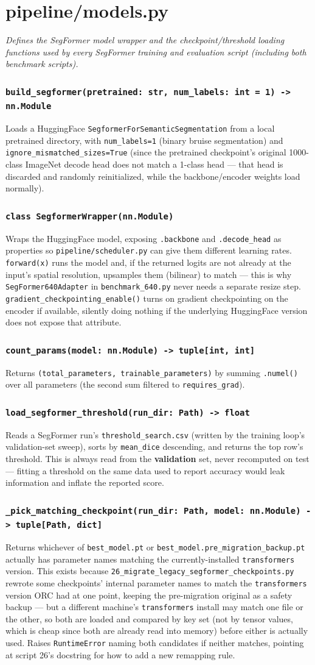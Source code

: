 \documentclass[11pt]{article}
\newcommand{\role}[1]{\par\noindent\textit{#1}\par\vspace{0.5em}}
\newcommand{\func}[1]{\subsubsection*{\texttt{#1}}}
\begin{document}
\newpage
\section{pipeline/models.py}
\role{Defines the SegFormer model wrapper and the checkpoint/threshold loading
functions used by every SegFormer training and evaluation script (including
both benchmark scripts).}

\func{build\_segformer(pretrained: str, num\_labels: int = 1) -> nn.Module}
Loads a HuggingFace \texttt{SegformerForSemanticSegmentation} from a local
pretrained directory, with \texttt{num\_labels=1} (binary bruise segmentation)
and \texttt{ignore\_mismatched\_sizes=True} (since the pretrained checkpoint's
original 1000-class ImageNet decode head does not match a 1-class head --- that
head is discarded and randomly reinitialized, while the backbone/encoder weights
load normally).

\func{class SegformerWrapper(nn.Module)}
Wraps the HuggingFace model, exposing \texttt{.backbone} and
\texttt{.decode\_head} as properties so \texttt{pipeline/scheduler.py} can give
them different learning rates. \texttt{forward(x)} runs the model and, if the
returned logits are not already at the input's spatial resolution, upsamples
them (bilinear) to match --- this is why \texttt{SegFormer640Adapter} in
\texttt{benchmark\_640.py} never needs a separate resize step.
\texttt{gradient\_checkpointing\_enable()} turns on gradient checkpointing on the
encoder if available, silently doing nothing if the underlying HuggingFace
version does not expose that attribute.

\func{count\_params(model: nn.Module) -> tuple[int, int]}
Returns \texttt{(total\_parameters, trainable\_parameters)} by summing
\texttt{.numel()} over all parameters (the second sum filtered to
\texttt{requires\_grad}).

\func{load\_segformer\_threshold(run\_dir: Path) -> float}
Reads a SegFormer run's \texttt{threshold\_search.csv} (written by the training
loop's validation-set sweep), sorts by \texttt{mean\_dice} descending, and
returns the top row's threshold. This is always read from the \textbf{validation}
set, never recomputed on test --- fitting a threshold on the same data used to
report accuracy would leak information and inflate the reported score.

\func{\_pick\_matching\_checkpoint(run\_dir: Path, model: nn.Module) -> tuple[Path, dict]}
Returns whichever of \texttt{best\_model.pt} or
\texttt{best\_model.pre\_migration\_backup.pt} actually has parameter names
matching the currently-installed \texttt{transformers} version. This exists
because \texttt{26\_migrate\_legacy\_segformer\_checkpoints.py} rewrote some
checkpoints' internal parameter names to match the \texttt{transformers} version
ORC had at one point, keeping the pre-migration original as a safety backup ---
but a different machine's \texttt{transformers} install may match one file or
the other, so both are loaded and compared by key set (not by tensor values,
which is cheap since both are already read into memory) before either is
actually used. Raises \texttt{RuntimeError} naming both candidates if neither
matches, pointing at script 26's docstring for how to add a new remapping rule.
\end{document}
